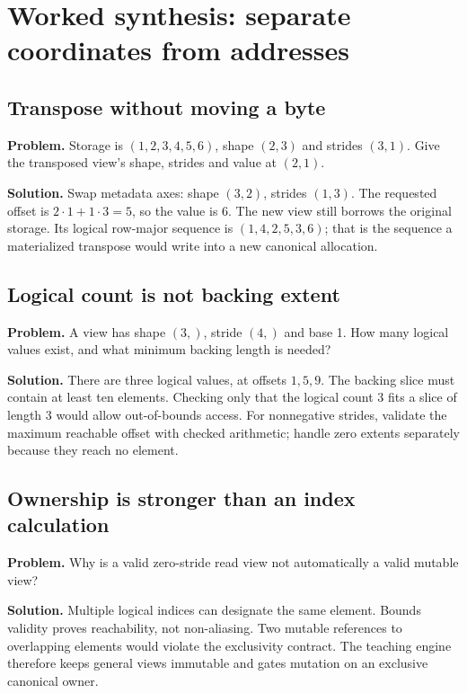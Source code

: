 \clearpage
\section{Worked synthesis: separate coordinates from addresses}
\subsection{Transpose without moving a byte}
\textbf{Problem.} Storage is $(1,2,3,4,5,6)$, shape $(2,3)$ and strides $(3,1)$.
Give the transposed view's shape, strides and value at $(2,1)$.

\textbf{Solution.} Swap metadata axes: shape $(3,2)$, strides $(1,3)$.
The requested offset is $2\cdot1+1\cdot3=5$, so the value is 6.
The new view still borrows the original storage. Its logical row-major
sequence is $(1,4,2,5,3,6)$; that is the sequence a materialized transpose
would write into a new canonical allocation.

\subsection{Logical count is not backing extent}
\textbf{Problem.} A view has shape $(3,)$, stride $(4,)$ and base 1.
How many logical values exist, and what minimum backing length is needed?

\textbf{Solution.} There are three logical values, at offsets $1,5,9$.
The backing slice must contain at least ten elements. Checking only that the
logical count 3 fits a slice of length 3 would allow out-of-bounds access.
For nonnegative strides, validate the maximum reachable offset with checked
arithmetic; handle zero extents separately because they reach no element.

\subsection{Ownership is stronger than an index calculation}
\textbf{Problem.} Why is a valid zero-stride read view not automatically a
valid mutable view?

\textbf{Solution.} Multiple logical indices can designate the same element.
Bounds validity proves reachability, not non-aliasing. Two mutable references
to overlapping elements would violate the exclusivity contract. The teaching
engine therefore keeps general views immutable and gates mutation on an
exclusive canonical owner.
